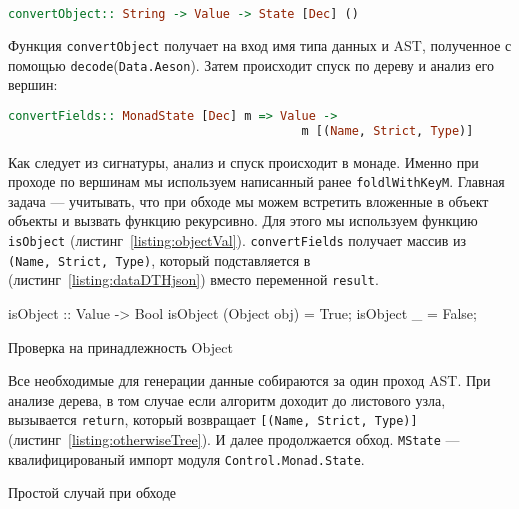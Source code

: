 \begin{lstlisting}[language=Haskell]
convertObject:: String -> Value -> State [Dec] ()
\end{lstlisting}

Функция \lstinline{convertObject} получает на вход имя типа данных и AST, полученное с помощью \lstinline{decode}\:(\lstinline{Data.Aeson}). Затем происходит спуск по дереву и анализ его вершин:

\begin{lstlisting}[language=Haskell]
convertFields:: MonadState [Dec] m => Value -> 
                                         m [(Name, Strict, Type)]
\end{lstlisting}

Как следует из сигнатуры, анализ и спуск происходит в монаде. Именно при проходе по вершинам мы используем написанный ранее \lstinline{foldlWithKeyM}. Главная задача --- учитывать, что при обходе мы можем встретить вложенные в объект объекты и вызвать функцию рекурсивно. Для этого мы используем функцию \lstinline{isObject} (листинг~\ref{listing:objectVal}). \lstinline{convertFields} получает массив из \lstinline{(Name, Strict, Type)}, который подставляется в (листинг~\ref{listing:dataDTHjson}) вместо переменной \lstinline{result}.

\begin{ListingEnv}[H]
\begin{Verb}
isObject :: Value -> Bool
isObject (Object obj) = True;
isObject _ = False;
\end{Verb}
\caption{Проверка на принадлежность Object}
\label{listing:objectVal}
\end{ListingEnv} 

Все необходимые для генерации данные собираются за один проход AST. При анализе дерева, в том случае если алгоритм доходит до листового узла, вызывается \lstinline{return}, который возвращает \lstinline{[(Name, Strict, Type)]} (листинг~\ref{listing:otherwiseTree}). И далее продолжается обход. \lstinline{MState} --- квалифицированый импорт модуля \lstinline{Control.Monad.State}.

\begin{ListingEnv}[H]
\caption{Простой случай при обходе}
\label{listing:otherwiseTree}
\end{ListingEnv} 

